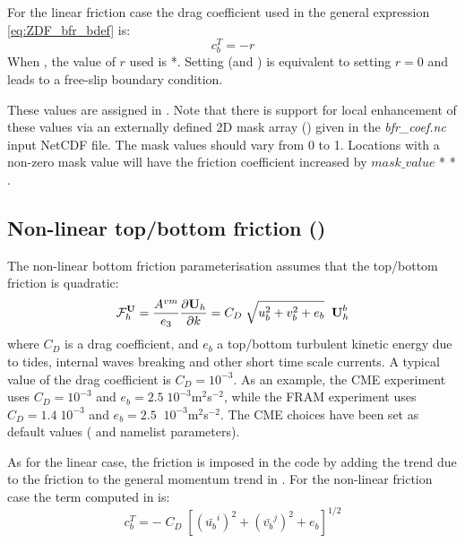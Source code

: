 \documentclass[../main/NEMO_manual]{subfiles}
\begin{document}
 For the linear friction case the drag coefficient used in the general expression \autoref{eq:ZDF_bfr_bdef} is:
\[
    c_b^T = - r
\]
When , the value of $r$ used is *.
Setting  (and ) is equivalent to setting $r=0$ and leads to a free-slip boundary condition.

These values are assigned in .
Note that there is support for local enhancement of these values via an externally defined 2D mask array
() given in the \textit{bfr\_coef.nc} input NetCDF file.
The mask values should vary from 0 to 1.
Locations with a non-zero mask value will have the friction coefficient increased by
$mask\_value$ *  * .

\subsection[Non-linear top/bottom friction (\forcode{ln_non_lin})]{Non-linear top/bottom friction (\protect{})}
\label{subsec:ZDF_drg_nonlinear}

The non-linear bottom friction parameterisation assumes that the top/bottom friction is quadratic:
\[
  {\cal F}_h^\textbf{U} = \frac{A^{vm}}{e_3 }\frac{\partial \textbf {U}_h
  }{\partial k}=C_D \;\sqrt {u_b ^2+v_b ^2+e_b } \;\; \textbf {U}_h^b
\]
where $C_D$ is a drag coefficient, and $e_b $ a top/bottom turbulent kinetic energy due to tides,
internal waves breaking and other short time scale currents.
A typical value of the drag coefficient is $C_D = 10^{-3} $.
As an example, the CME experiment \citep{treguier_JGR92} uses $C_D = 10^{-3}$ and
$e_b = 2.5\;10^{-3}$m$^2$\;s$^{-2}$, while the FRAM experiment \citep{killworth_JPO92} uses $C_D = 1.4\;10^{-3}$ and
$e_b =2.5\;\;10^{-3}$m$^2$\;s$^{-2}$.
The CME choices have been set as default values ( and  namelist parameters).

As for the linear case, the friction is imposed in the code by adding the trend due to
the friction to the general momentum trend in .
For the non-linear friction case the term computed in  is:
\[
    c_b^T = - \; C_D\;\left[ \left(\bar{u_b}^{i}\right)^2 + \left(\bar{v_b}^{j}\right)^2 + e_b \right]^{1/2}
\]
\end{document}
